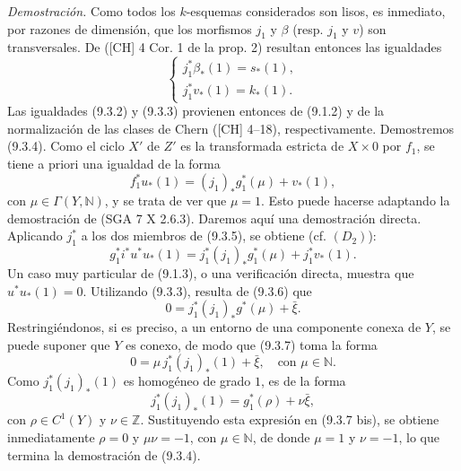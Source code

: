 \emph{Demostración.} Como todos los $k$-esquemas considerados son lisos, es inmediato, por razones de dimensión, que los morfismos $j_1$ y $\beta$ (resp. $j_1$ y $v$) son transversales. De ([CH] 4 Cor. 1 de la prop. 2) resultan entonces las igualdades
\[
\begin{cases}
j_1^*\beta_*(1)=s_*(1),\\
j_1^*v_*(1)=k_*(1).
\end{cases}
\]
Las igualdades (9.3.2) y (9.3.3) provienen entonces de (9.1.2) y de la normalización de las clases de Chern ([CH] 4--18), respectivamente. Demostremos (9.3.4). Como el ciclo $X'$ de $Z'$ es la transformada estricta de $X\times0$ por $f_1$, se tiene a priori una igualdad de la forma
\[
f_1^*u_*(1)=(j_1)_*g_1^*(\mu)+v_*(1),
\tag{9.3.5}
\]
con $\mu\in\Gamma(Y,\mathbb N)$, y se trata de ver que $\mu=1$. Esto puede hacerse adaptando la demostración de (SGA 7 X 2.6.3). Daremos aquí una demostración directa. Aplicando $j_1^*$ a los dos miembros de (9.3.5), se obtiene (cf. $(D_2)$):
\[
g_1^*i^*u^*u_*(1)=j_1^*(j_1)_*g_1^*(\mu)+j_1^*v_*(1).
\tag{9.3.6}
\]
Un caso muy particular de (9.1.3), o una verificación directa, muestra que $u^*u_*(1)=0$. Utilizando (9.3.3), resulta de (9.3.6) que
\[
0=j_1^*(j_1)_*g^*(\mu)+\bar\xi.
\tag{9.3.7}
\]
Restringiéndonos, si es preciso, a un entorno de una componente conexa de $Y$, se puede suponer que $Y$ es conexo, de modo que (9.3.7) toma la forma
\[
0=\mu\,j_1^*(j_1)_*(1)+\bar\xi,\quad\text{con }\mu\in\mathbb N.
\tag{9.3.7 bis}
\]
Como $j_1^*(j_1)_*(1)$ es homogéneo de grado $1$, es de la forma
\[
j_1^*(j_1)_*(1)=g_1^*(\rho)+\nu\bar\xi,
\]
con $\rho\in C^1(Y)$ y $\nu\in\mathbb Z$. Sustituyendo esta expresión en (9.3.7 bis), se obtiene inmediatamente $\rho=0$ y $\mu\nu=-1$, con $\mu\in\mathbb N$, de donde $\mu=1$ y $\nu=-1$, lo que termina la demostración de (9.3.4).
